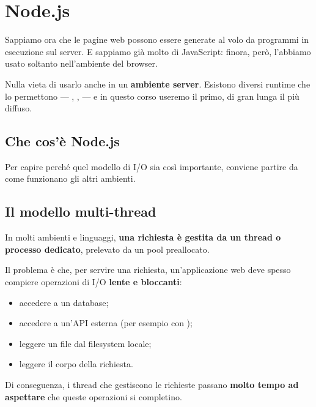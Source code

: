 \chapter{Node.js}

Sappiamo ora che le pagine web possono essere generate al volo da programmi in
esecuzione sul server. E sappiamo già molto di JavaScript: finora, però, l'abbiamo
usato soltanto nell'ambiente del browser.

Nulla vieta di usarlo anche in un \textbf{ambiente server}. Esistono diversi
runtime che lo permettono --- , ,  --- e in
questo corso useremo il primo, di gran lunga il più diffuso.

\section{Che cos'è Node.js}


Per capire perché quel modello di I/O sia così importante, conviene partire da
come funzionano gli altri ambienti.

\section{Il modello multi-thread}

In molti ambienti e linguaggi, \textbf{una richiesta è gestita da un
thread o processo dedicato}, prelevato da un pool preallocato.

Il problema è che, per servire una richiesta, un'applicazione web deve spesso
compiere operazioni di I/O \textbf{lente e bloccanti}:

\begin{itemize}
  \item accedere a un database;
  \item accedere a un'API esterna (per esempio con );
  \item leggere un file dal filesystem locale;
  \item leggere il corpo della richiesta.
\end{itemize}

Di conseguenza, i thread che gestiscono le richieste passano \textbf{molto
tempo ad aspettare} che queste operazioni si completino.

